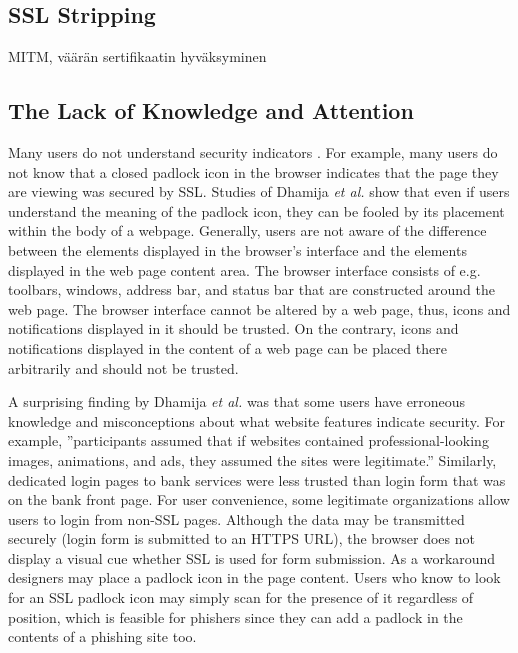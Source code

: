 \documentclass[english,gradu]{tktltiki}
\begin{document}

\subsection{SSL Stripping} %
\label{sub:ssl_stripping}
MITM, väärän sertifikaatin hyväksyminen


\subsection{The Lack of Knowledge and Attention} %
\label{sub:the_lack_of_knowledge_and_attention}

              Many users do not understand security indicators \cite{why_phishing_works_06}. For example, many users do not know that a closed padlock icon in the browser indicates that the page they are viewing was secured by SSL. Studies of Dhamija \emph{et al.} \cite{why_phishing_works_06} show that even if users understand the meaning of the padlock icon, they can be fooled by its placement within the body of a webpage. Generally, users are not aware of the difference between the elements displayed in the browser's interface and the elements displayed in the web page content area. The browser interface consists of e.g. toolbars, windows, address bar, and status bar that are constructed around the web page. The browser interface cannot be altered by a web page, thus, icons and notifications displayed in it should be trusted. On the contrary, icons and notifications displayed in the content of a web page can be placed there arbitrarily and should not be trusted.

                  A surprising finding by Dhamija \emph{et al.} \cite{why_phishing_works_06} was that some users have erroneous knowledge and misconceptions about what website features indicate security. For example, ''participants assumed that if websites contained professional-looking images, animations, and ads, they assumed the sites were legitimate.'' Similarly, dedicated login pages to bank services were less trusted than login form that was on the bank front page. For user convenience, some legitimate organizations allow users to login from non-SSL pages. Although the data may be transmitted securely (login form is submitted to an HTTPS URL), the browser does not display a visual cue whether SSL is used for form submission. As a workaround designers may place a padlock icon in the page content. Users who know to look for an SSL padlock icon may simply scan for the presence of it regardless of position, which is feasible for phishers since they can add a padlock in the contents of a phishing site too.
\end{document}
